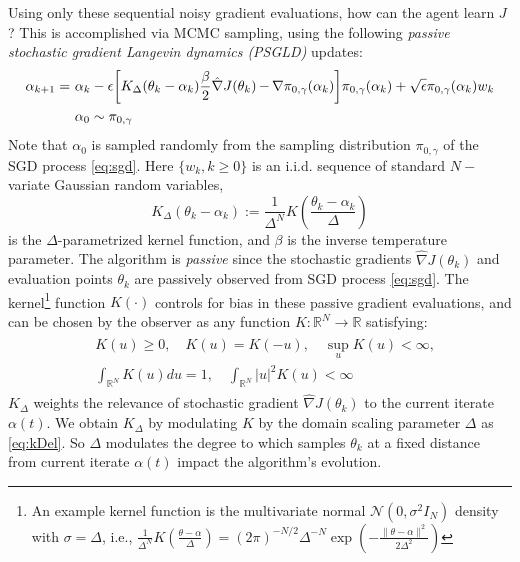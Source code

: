 \documentclass[journal,onecolumn]{IEEEtran}
\newcommand{\alk}{\alpha_k}
\newcommand{\alkk}{\alpha_{k+1}}
\newcommand{\thk}{\theta_k}
\newcommand{\step}{\epsilon}
\newcommand{\delstep}{\frac{1}{\Delta^N}}
\newcommand{\kernel}{K\left(\frac{\theta_k -\alk}{\Delta}\right)}
\newcommand{\grad}{\nabla}
\newcommand{\gradn}{\hat{\nabla}}
\newcommand{\rew}{J}
\newcommand{\gaus}{\mathcal{N}}
\newcommand{\reals}{\mathbb{R}}
\newcommand{\alt}{\alpha(t)}
\newcommand{\dimn}{N}
\newcommand{\K}{K}
\newcommand{\Kd}{\K_{\Delta}}
\newcommand{\sgdstep}{\eta}
\newcommand{\ids}{\pi}
\newcommand{\idw}{\gamma}
\newcommand{\isp}{0,\idw}
\newcommand{\idistrw}{\ids_{\isp}}
\begin{document}
Using only these sequential noisy gradient evaluations, how can the agent learn $\rew$? This is accomplished via MCMC sampling, using the following
\textit{passive stochastic gradient Langevin dynamics (PSGLD)} updates:
\begin{align}
\begin{split}
\label{eq:dt_sgld}
    \alkk =\ &\alk - \step\biggl[\Kd(\thk-\alk)\frac{\beta}{2} \gradn \rew (\thk) \,\color{black}{-}\, \grad \idistrw(\alk)\biggr]\idistrw(\alk) + \sqrt{\step}\idistrw(\alk) w_k \\
    &\alpha_0 \sim \idistrw
\end{split}
\end{align}
Note that $\alpha_0$ is sampled randomly from the sampling distribution $\idistrw$ of the SGD process \eqref{eq:sgd}. Here $\{w_k, k\geq 0\}$ is an i.i.d. sequence of standard $N-$variate Gaussian random variables, 
\begin{equation}
    \label{eq:kDel}
    \Kd(\thk-\alk) := \delstep\kernel
\end{equation} is the $\Delta$-parametrized kernel function, and $\beta$ is the inverse temperature parameter. The algorithm is \textit{passive} since the stochastic gradients $\gradn\rew(\thk)$ and evaluation points $\thk$ are passively observed from SGD process \eqref{eq:sgd}. The kernel\footnote{An example kernel function is the multivariate normal $\gaus(0,\sigma^2I_{\dimn})$ density with $\sigma = \Delta$, i.e.,
$\delstep \K(\frac{\theta-\alpha}{\Delta}) = (2\pi)^{-\dimn/2}\Delta^{-\dimn}\exp(-\frac{\|\theta-\alpha\|^2}{2\Delta^2})$} function $\K(\cdot)$ controls for bias in these passive gradient evaluations, and can be chosen by the observer as any function $\K: \reals^{\dimn} \to \reals$ satisfying: 
\begin{align}
\begin{split}
\label{eq:Kspec}
    &\K(u) \geq 0, \quad \K(u) = \K(-u), \quad \sup_u \K(u) < \infty, \\ &\int_{\reals^{\dimn}}\K(u)du = 1, \quad \int_{\reals^{\dimn}}|u|^2\K(u) < \infty
\end{split}
\end{align}
$\K_{\Delta}$ weights the relevance of stochastic gradient $\gradn\rew(\thk)$ to the current iterate $\alt$. We obtain $\Kd$ by modulating $\K$ by the domain scaling parameter $\Delta$ as \eqref{eq:kDel}. So $\Delta$ modulates the degree to which samples $\thk$ at a fixed distance from current iterate $\alt$ impact the algorithm's evolution.
 
\end{document}
